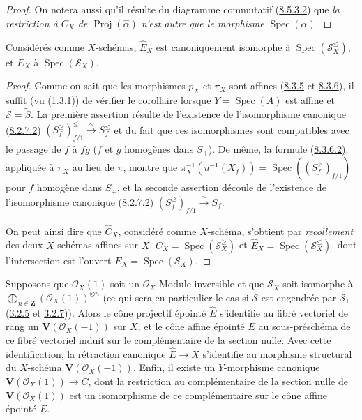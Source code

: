 \begin{proof}
On notera aussi qu'il résulte du diagramme commutatif
(\hyperref[II.8.5.3.2-fr]{8.5.3.2}) que \emph{la restriction à $C_X$ de
$\operatorname{Proj}(\widehat{\alpha})$ n'est autre que le morphisme
$\operatorname{Spec}(\alpha)$}.
\end{proof}

\begin{corollary}[8.6.3]
\label{II.8.6.3-fr}
Considérés comme $X$-schémas, $\widehat{E}_X$ est canoniquement isomorphe à
$\operatorname{Spec}(\mathcal{S}_X^{\leq})$, et $E_X$ à
$\operatorname{Spec}(\mathcal{S}_X)$.
\end{corollary}

\begin{proof}
Comme on sait que les morphismes $p_X$ et $\pi_X$ sont affines
(\hyperref[II.8.3.5-fr]{8.3.5} et
\hyperref[II.8.3.6-fr]{8.3.6}), il suffit (vu
(\hyperref[II.1.3.1-fr]{1.3.1})) de vérifier le corollaire lorsque
$Y=\operatorname{Spec}(A)$ est affine et $\mathcal{S}=\widetilde{S}$. La
première assertion résulte de l'existence de l'isomorphisme canonique
(\hyperref[II.8.2.7.2-fr]{8.2.7.2})
$(S_f^{\geq})_{f/1}^{\leq}\xrightarrow{\sim}S_f^{\leq}$ et du fait que ces
isomorphismes sont compatibles avec le passage de $f$ à $fg$ ($f$ et $g$
homogènes dans $S_+$). De même, la formule
(\hyperref[II.8.3.6.2-fr]{8.3.6.2}), appliquée à $\pi_X$ au lieu de $\pi$,
montre que
$\pi_X^{-1}(u^{-1}(X_f))=
\operatorname{Spec}((S_f^{\geq})_{f/1})$ pour $f$ homogène dans $S_+$, et la
seconde assertion découle de l'existence de l'isomorphisme canonique
(\hyperref[II.8.2.7.2-fr]{8.2.7.2})
$(S_f^{\geq})_{f/1}\xrightarrow{\sim}S_f$.

On peut ainsi dire que $\widehat{C}_X$, considéré comme $X$-schéma, s'obtient
par \emph{recollement} des deux $X$-schémas affines sur $X$,
$C_X=\operatorname{Spec}(\mathcal{S}_X^{\geq})$ et
$\widehat{E}_X=\operatorname{Spec}(\mathcal{S}_X^{\leq})$, dont
l'intersection est l'ouvert $E_X=\operatorname{Spec}(\mathcal{S}_X)$.
\end{proof}

\begin{corollary}[8.6.4]
\label{II.8.6.4-fr}
Supposons que $\mathcal{O}_X(1)$ soit un $\mathcal{O}_X$-Module inversible et
que $\mathcal{S}_X$ soit isomorphe à
$\bigoplus_{n\in\mathbf{Z}}(\mathcal{O}_X(1))^{\otimes n}$ (ce qui sera en
particulier le cas si $\mathcal{S}$ est engendrée par $\mathcal{S}_1$
(\hyperref[II.3.2.5-fr]{3.2.5} et
\hyperref[II.3.2.7-fr]{3.2.7})). Alors le cône projectif épointé
$\widehat{E}$ s'identifie au fibré vectoriel de rang un
$\mathbf{V}(\mathcal{O}_X(-1))$ sur $X$, et le cône affine épointé $E$ au
sous-préschéma de ce fibré vectoriel induit sur le complémentaire de la
section nulle. Avec cette identification, la rétraction canonique
$\widehat{E}\to X$ s'identifie au morphisme structural du $X$-schéma
$\mathbf{V}(\mathcal{O}_X(-1))$. Enfin, il existe un $Y$-morphisme canonique
$\mathbf{V}(\mathcal{O}_X(1))\to C$, dont la restriction au complémentaire de
la section nulle de $\mathbf{V}(\mathcal{O}_X(1))$ est un isomorphisme de ce
complémentaire sur le cône affine épointé $E$.
\end{corollary}

